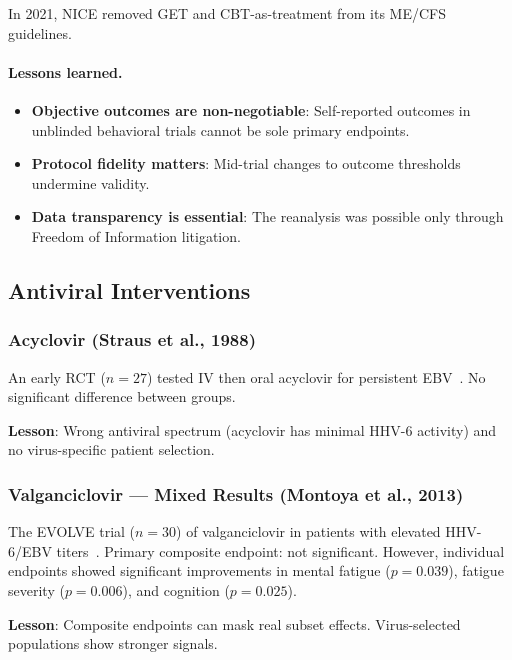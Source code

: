 In 2021, NICE removed GET and CBT-as-treatment from its ME/CFS guidelines.

\paragraph{Lessons learned.}
\begin{itemize}
    \item \textbf{Objective outcomes are non-negotiable}: Self-reported outcomes in unblinded behavioral trials cannot be sole primary endpoints.
    \item \textbf{Protocol fidelity matters}: Mid-trial changes to outcome thresholds undermine validity.
    \item \textbf{Data transparency is essential}: The reanalysis was possible only through Freedom of Information litigation.
\end{itemize}

\subsection{Antiviral Interventions}
\label{subsec:neg-antiviral}

\subsubsection{Acyclovir (Straus et al., 1988)}

An early RCT ($n = 27$) tested IV then oral acyclovir for persistent EBV~\cite{Straus1988}. No significant difference between groups.

\textbf{Lesson}: Wrong antiviral spectrum (acyclovir has minimal HHV-6 activity) and no virus-specific patient selection.

\subsubsection{Valganciclovir --- Mixed Results (Montoya et al., 2013)}

The EVOLVE trial ($n = 30$) of valganciclovir in patients with elevated HHV-6/EBV titers~\cite{Montoya2013valganciclovir}. Primary composite endpoint: not significant. However, individual endpoints showed significant improvements in mental fatigue ($p = 0.039$), fatigue severity ($p = 0.006$), and cognition ($p = 0.025$).

\textbf{Lesson}: Composite endpoints can mask real subset effects. Virus-selected populations show stronger signals.

